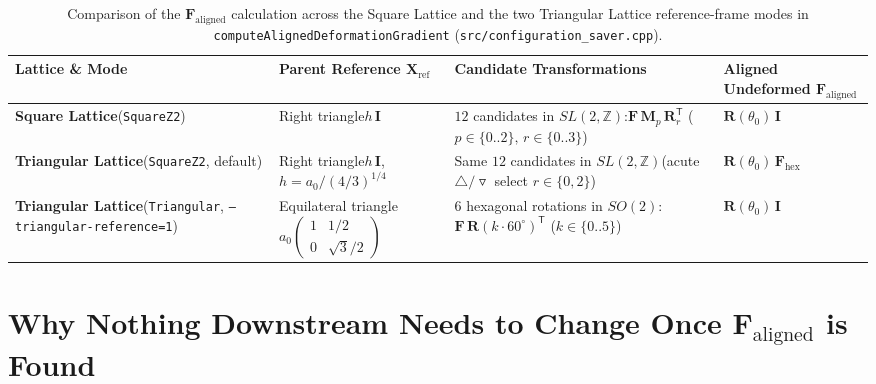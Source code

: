 \documentclass[11pt,a4paper]{article}
\newcommand{\Z}{\mathbb{Z}}
\newcommand{\T}{^{\mathsf T}}
\newcommand{\code}[1]{\texttt{#1}}
\begin{document}
\begin{table}[htbp]
\centering
\renewcommand{\arraystretch}{1.35}
\small
\begin{tabular}{@{}p{3.4cm}p{3.6cm}p{4.3cm}p{3.5cm}@{}}
\toprule
\textbf{Lattice \& Mode} & \textbf{Parent Reference $\mathbf{X}_{\text{ref}}$} & \textbf{Candidate Transformations} & \textbf{Aligned Undeformed $\mathbf{F}_{\text{aligned}}$} \\
\midrule
\textbf{Square Lattice}\newline (\code{SquareZ2}) &
Right triangle\newline $h\,\mathbf{I}$ &
$12$ candidates in $SL(2,\Z)$:\newline $\mathbf{F}\,\mathbf{M}_p\,\mathbf{R}_r\T$ ($p\in\{0..2\},\, r\in\{0..3\}$) &
$\mathbf{R}(\theta_0)\,\mathbf{I}$ \\[6pt]
\textbf{Triangular Lattice}\newline (\code{SquareZ2}, default) &
Right triangle\newline $h\,\mathbf{I}$, $h = a_0/(4/3)^{1/4}$ &
Same $12$ candidates in $SL(2,\Z)$\newline (acute $\triangle/\triangledown$ select $r\in\{0,2\}$) &
$\mathbf{R}(\theta_0)\,\mathbf{F}_{\text{hex}}$ \\[6pt]
\textbf{Triangular Lattice}\newline (\code{Triangular}, \code{--triangular-reference=1}) &
Equilateral triangle\newline $a_0\begin{pmatrix} 1 & 1/2 \\ 0 & \sqrt{3}/2 \end{pmatrix}$ &
$6$ hexagonal rotations in $SO(2)$:\newline $\mathbf{F}\,\mathbf{R}(k\cdot 60^\circ)\T$ ($k\in\{0..5\}$) &
$\mathbf{R}(\theta_0)\,\mathbf{I}$ \\
\bottomrule
\end{tabular}
\caption{Comparison of the $\mathbf{F}_{\text{aligned}}$ calculation across the Square Lattice and the two Triangular Lattice reference-frame modes in \code{computeAlignedDeformationGradient} (\code{src/configuration\_saver.cpp}).}
\label{tab:summary_modes}
\end{table}

\section{Why Nothing Downstream Needs to Change Once $\mathbf{F}_{\text{aligned}}$ is Found}
\end{document}
